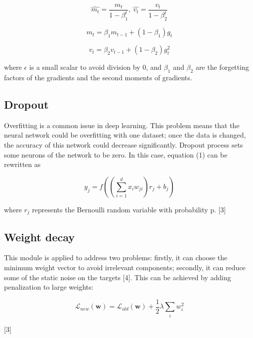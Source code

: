 \documentclass[twoside,twocolumn,10.8pt]{article}
\begin{document}
\begin{equation}
\label{eq:5}
\widehat{m_t}=\frac{m_t}{1-\beta_1^t},\ \widehat{v_t}=\frac{v_t}{1-\beta_2^t}
\end{equation}

\begin{equation}
\label{eq:6}
m_t=\beta_1m_{t-1}+(1-\beta_1)g_t
\end{equation}

\begin{equation}
\label{eq:7}
v_t=\beta_2v_{t-1}+(1-\beta_2)g_t^2
\end{equation}

\noindent where $\epsilon$ is a small scalar to avoid division by 0, and $\beta_1$ and $\beta_2$ are the forgetting factors of the gradients and the second moments of gradients. 

\subsection{Dropout}

Overfitting is a common issue in deep learning. This problem means that the neural network could be overfitting with one dataset; once the data is changed, the accuracy of this network could decrease significantly. Dropout process sets some neurons of the network to be zero. In this case, equation (1) can be rewritten as 

\begin{equation}
\label{eq:8}
y_j=f((\sum_{i=1}^{d}x_iw_{ji})r_j+b_j)
\end{equation}

\noindent where $r_j$ represents the Bernoulli random variable with probability p. [3]

\subsection{Weight decay}

This module is applied to address two problems: firstly, it can choose the minimum weight vector to avoid irrelevant components; secondly, it can reduce some of the static noise on the targets [4]. This can be achieved by adding penalization to large weights:

\begin{equation}
\label{eq:9}
\mathcal{L}_{new}(\textbf{w})=\mathcal{L}_{old}(\textbf{w})+\frac{1}{2}\lambda\sum_{i}w_i^2
\end{equation}

[3]
\end{document}
